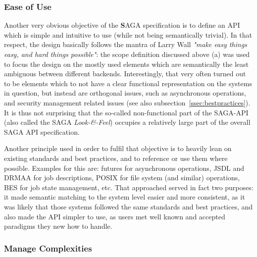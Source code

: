 \documentclass[a4paper,12pt]{article}
\newcommand{\I}[1]{\textit{#1}}
\newcommand{\B}[1]{\textbf{#1}}
\begin{document}
   \subsubsection*{Ease of Use}


    Another very obvious objective of the \B{S}AGA specification is to
    define an API which is simple and intuitive to use (while not
    being semantically trivial).  In that respect, the design
    basically follows the mantra of Larry Wall \I{"make easy things
    easy, and hard things possible"}: the scope definition discussed
    above (a) was used to focus the design on the mostly used elements
    which are semantically the least ambiguous between different
    backends.  Interestingly, that very often turned out to be
    elements which to not have a clear functional representation on
    the systems in question, but instead are orthogonal issues, such
    as asynchronous operations, and security management related issues
    (see also subsection~\ref{ssec:bestpractices}).  It is thus not
    surprising that the so-called non-functional part of the SAGA-API
    (also called the SAGA \I{Look-\&-Feel}) occupies a relatively
    large part of the overall SAGA API specification.

    Another principle used in order to fulfil that objective is to
    heavily lean on existing standards and best practices, and to
    reference or use them where possible.  Examples for this are:
    futures for asynchronous operations, JSDL and DRMAA for job
    descriptions, POSIX for file system (and similar) operations, BES
    for job state management, etc.  That approached served in fact two
    purposes: it made semantic matching to the system level easier and
    more consistent, as it was likely that those systems followed the
    same standards and best practices, and also made the API simpler
    to use, as users met well known and accepted paradigms they new
    how to handle.


   \subsubsection*{Manage Complexities}
   \label{ssec:obj.compl}

    
\end{document}
